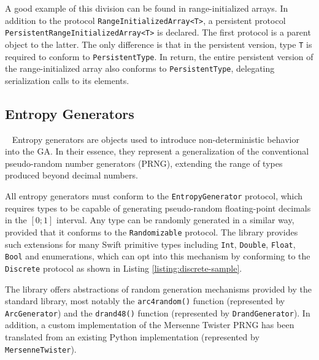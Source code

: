 A good example of this division can be found in range-initialized arrays. In addition to the protocol \texttt{RangeInitializedArray<T>}, a persistent protocol \texttt{PersistentRangeInitializedArray<T>} is declared. The first protocol is a parent object to the latter. The only difference is that in the persistent version, type \texttt{T} is required to conform to \texttt{PersistentType}. In return, the entire persistent version of the range-initialized array also conforms to \texttt{PersistentType}, delegating serialization calls to its elements.

\subsection{Entropy Generators}~\label{section:entropy-generators}
Entropy generators are objects used to introduce non-deterministic behavior into the GA. In their essence, they represent a generalization of the conventional pseudo-random number generators (PRNG), extending the range of types produced beyond decimal numbers.

All entropy generators must conform to the \texttt{EntropyGenerator} protocol, which requires types to be capable of generating pseudo-random floating-point decimals in the $[0;1]$ interval. Any type can be randomly generated in a similar way, provided that it conforms to the \texttt{Randomizable} protocol. The library provides such extensions for many Swift primitive types including \texttt{Int}, \texttt{Double}, \texttt{Float}, \texttt{Bool} and enumerations, which can opt into this mechanism by conforming to the \texttt{Discrete} protocol as shown in Listing \ref{listing:discrete-sample}.

The library offers abstractions of random generation mechanisms provided by the standard library, most notably the \texttt{arc4random()} function (represented by \texttt{ArcGenerator}) and the \texttt{drand48()} function (represented by \texttt{DrandGenerator}). In addition, a custom implementation of the Mersenne Twister PRNG has been translated from an existing Python implementation (represented by \texttt{MersenneTwister}).
